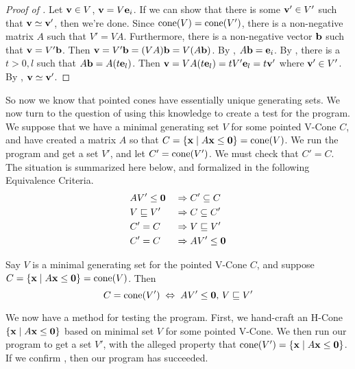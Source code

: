 \begin{proof}[Proof of ]
	Let $\mathbf{v}\in V$, $\mathbf{v}=V\mathbf{e}_i$.  If we can show that there is some $\mathbf{v}'\in V'$ such that $\mathbf{v}\simeq\mathbf{v}'$, then we're done.  Since $\operatorname{cone}(V)=\operatorname{cone}(V')$, there is a non-negative matrix $A$ such that $V'=VA$.  Furthermore, there is a non-negative vector $\mathbf{b}$ such that $\mathbf{v}=V'\mathbf{b}$.  Then $\mathbf{v}=V'\mathbf{b}=(VA)\mathbf{b}=V(A\mathbf{b})$.  By , $A\mathbf{b}=\mathbf{e}_i$.  By , there is a $t>0,l$ such that $A\mathbf{b}=A(t\mathbf{e}_l)$.  Then $\mathbf{v}=VA(t\mathbf{e}_l)=tV'\mathbf{e}_l=t\mathbf{v}'$ where $\mathbf{v}'\in V'$.  By , $\mathbf{v}\simeq\mathbf{v}'$.
\end{proof}

So now we know that pointed cones have essentially unique generating sets.  We now turn to the question of using this knowledge to create a test for the program.  We suppose that we have a minimal generating set $V$ for some pointed V-Cone $C$, and have created a matrix $A$ so that $C = \left\{\mathbf{x}\;|\; A\mathbf{x}\leq\mathbf{0}\right\} = \operatorname{cone}(V)$.  We run the program and get a set $V'$, and let $C'=\operatorname{cone}(V')$.  We must check that $C' = C$.  The situation is summarized here below, and formalized in the following Equivalence Criteria.
\begin{alignat*}{2}
	 & AV'\leq\mathbf{0} \;        & \Rightarrow & \; C' \subseteq C   \\
	 & V \sqsubseteq V' \; & \Rightarrow & \; C \subseteq C'   \\
	 & C' = C \;           & \Rightarrow & \; V \sqsubseteq V' \\
	 & C' = C \;           & \Rightarrow & \; AV'\leq\mathbf{0}
\end{alignat*}

\begin{EqCriteria}\label{eq_hc_vc}
	Say $V$ is a minimal generating set for the pointed V-Cone $C$, and suppose $C = \left\{\mathbf{x}\;|\; A\mathbf{x}\leq\mathbf{0}\right\} = \operatorname{cone}(V)$.  Then
	\[ C = \operatorname{cone}(V') \;\Leftrightarrow\; AV'\leq\mathbf{0},\, V \sqsubseteq V' \]
\end{EqCriteria}

\begin{Test}\label{test_hc_to_vc}
	We now have a method for testing the program.  First, we hand-craft an H-Cone $\left\{\mathbf{x}\;|\; A\mathbf{x}\leq\mathbf{0}\right\}$ based on minimal set $V$ for some pointed V-Cone. We then run our program to get a set $V'$, with the alleged property that $\operatorname{cone}(V') = \left\{\mathbf{x}\;|\; A\mathbf{x}\leq\mathbf{0}\right\}$.  If we confirm , then our program has succeeded.
\end{Test}

